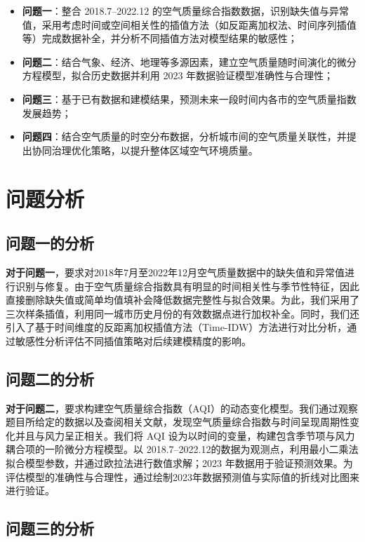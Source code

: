 \documentclass[a4paper,12pt]{article}
\begin{document}
	\begin{itemize}
		\item \textbf{问题一}：整合 2018.7–2022.12 的空气质量综合指数数据，识别缺失值与异常值，采用考虑时间或空间相关性的插值方法（如反距离加权法、时间序列插值等）完成数据补全，并分析不同插值方法对模型结果的敏感性；
		\item \textbf{问题二}：结合气象、经济、地理等多源因素，建立空气质量随时间演化的微分方程模型，拟合历史数据并利用 2023 年数据验证模型准确性与合理性；
		\item \textbf{问题三}：基于已有数据和建模结果，预测未来一段时间内各市的空气质量指数发展趋势；
		\item \textbf{问题四}：结合空气质量的时空分布数据，分析城市间的空气质量关联性，并提出协同治理优化策略，以提升整体区域空气环境质量。
	\end{itemize}
	
	\section{问题分析}  
	
	\subsection{问题一的分析}  
	\textbf{对于问题一}，要求对2018年7月至2022年12月空气质量数据中的缺失值和异常值进行识别与修复。由于空气质量综合指数具有明显的时间相关性与季节性特征，因此直接删除缺失值或简单均值填补会降低数据完整性与拟合效果。为此，我们采用了三次样条插值，利用同一城市历史月份的有效数据点进行加权补全。同时，我们还引入了基于时间维度的反距离加权插值方法（Time-IDW）方法进行对比分析，通过敏感性分析评估不同插值策略对后续建模精度的影响。
		
	\subsection{问题二的分析}
	
	\textbf{对于问题二}，要求构建空气质量综合指数（AQI）的动态变化模型。我们通过观察题目所给定的数据以及查阅相关文献\cite{ref2}，发现空气质量综合指数与时间呈现周期性变化并且与风力呈正相关。我们将 AQI 设为以时间的变量，构建包含季节项与风力耦合项的一阶微分方程模型。以 2018.7–2022.12的数据为观测点，利用最小二乘法拟合模型参数，并通过欧拉法进行数值求解；2023 年数据用于验证预测效果。为评估模型的准确性与合理性，通过绘制2023年数据预测值与实际值的折线对比图来进行验证。

	\subsection{问题三的分析}
	
\end{document}

